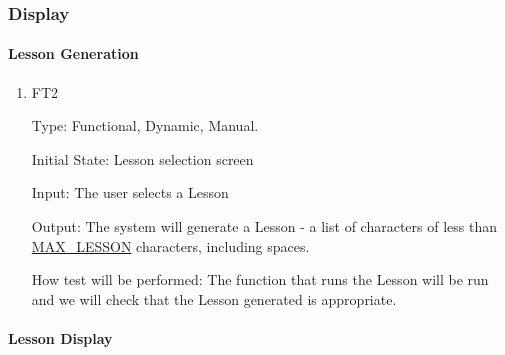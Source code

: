 \documentclass[12pt, titlepage]{article}
\begin{document}
\subsubsection{Display}
\paragraph{Lesson Generation}

\begin{enumerate}

\item{{\color{cyan}FT2}\\}

Type: Functional, Dynamic, Manual.
					
Initial State: Lesson selection screen
					
Input: The user selects a Lesson
					
Output: The system will generate a Lesson - a list of characters of less than \hyperref[symbols]{MAX\_LESSON} characters, including spaces.
					
How test will be performed: The function that runs the Lesson will be run and we will check that the Lesson generated is appropriate. 

\end{enumerate}

\paragraph{Lesson Display}
\end{document}
